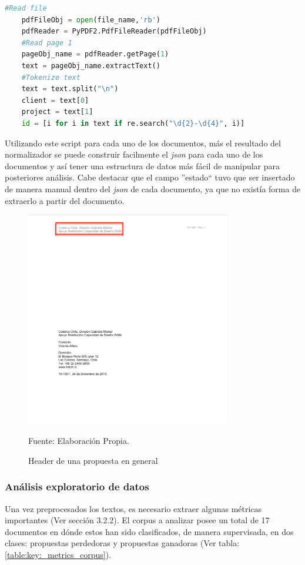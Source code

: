     \begin{lstlisting}[language=Python]
    #Read file
    pdfFileObj = open(file_name,'rb')     
    pdfReader = PyPDF2.PdfFileReader(pdfFileObj)
    #Read page 1
    pageObj_name = pdfReader.getPage(1)
    text = pageObj_name.extractText()
    #Tokenize text 
    text = text.split("\n")
    client = text[0]
    project = text[1]
    id = [i for i in text if re.search("\d{2}-\d{4}", i)]
    \end{lstlisting}
    
    Utilizando este script para cada uno de los documentos, más el resultado del normalizador se puede construir facilmente el \textit{json} para cada uno de los documentos y así tener una estructura de datos más fácil de manipular para posteriores análisis. Cabe destacar que el campo ''estado`` tuvo que ser insertado de manera manual dentro del \textit{json} de cada documento, ya que no existía forma de extraerlo a partir del documento.
    
    \begin{figure}[h!]
    \centering
    \includegraphics[width=0.8\textwidth]{figures/Header.png}
    \caption{\label{fig:portada_propuesta} Header de una propuesta en general} Fuente: Elaboración Propia.
    \end{figure}
    
    
    
\subsubsection{Análisis exploratorio de datos}
    Una vez preprocesados los textos, es necesario extraer algunas métricas importantes (Ver sección 3.2.2). El corpus a analizar posee un total de 17 documentos en dónde estos han sido clasificados, de manera supervisada, en dos clases: propuestas perdedoras y propuestas ganadoras (Ver tabla: \ref{table:key:_metrics_corpus}).
    
